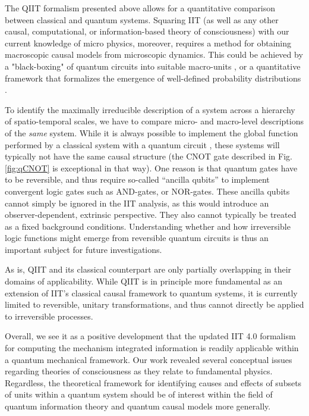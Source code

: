 \documentclass[preprints, article, accept, pdftex, moreauthors, letterpaper]{Definitions/mdpi}
\renewcommand{\=}[1]{\stackrel{#1}{=}} %
\renewcommand{\*}{\otimes}%
\begin{document}
The QIIT formalism presented above allows for a quantitative comparison between classical and quantum systems. Squaring IIT (as well as any other causal, computational, or information-based theory of consciousness) with our current knowledge of micro physics, moreover, requires a method for obtaining macroscopic causal models from microscopic dynamics. This could be achieved by a "black-boxing" of quantum circuits into suitable macro-units \cite{Marshall2018}, or a quantitative framework that formalizes the emergence of well-defined probability distributions \cite{Durham2020}. 

To identify the maximally irreducible description of a system across a hierarchy of spatio-temporal scales, we have to compare micro- and macro-level descriptions of the \textit{same} system. While it is always possible to implement the global function performed by a classical system with a quantum circuit \cite{NielsonChuang2011}, these systems will typically not have the same causal structure (the CNOT gate described in Fig. \ref{fig:qCNOT} is exceptional in that way). One reason is that quantum gates have to be reversible, and thus require so-called ``ancilla qubits'' to implement convergent logic gates such as AND-gates, or NOR-gates. These ancilla qubits cannot simply be ignored in the IIT analysis, as this would introduce an observer-dependent, extrinsic perspective. They also cannot typically be treated as a fixed background conditions. Understanding whether and how irreversible logic functions might emerge from reversible quantum circuits is thus an important subject for future investigations.

As is, QIIT and its classical counterpart are only partially overlapping in their domains of applicability. While QIIT is in principle more fundamental as an extension of IIT's classical causal framework to quantum systems, it is currently limited to reversible, unitary transformations, and thus cannot directly be applied to irreversible processes. 

Overall, we see it as a positive development that the updated IIT 4.0 formalism for computing the mechanism integrated information \cite{Barbosa2021} is readily applicable within a quantum mechanical framework. Our work revealed several conceptual issues regarding theories of consciousness as they relate to fundamental physics. Regardless, the theoretical framework for identifying causes and effects of subsets of units within a quantum system should be of interest within the field of quantum information theory and quantum causal models more generally.
\end{document}
